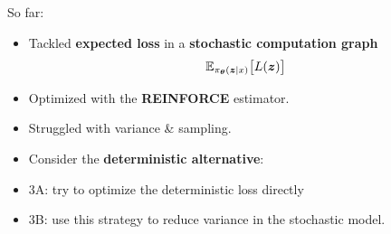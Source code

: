 
\begin{frame}
\centering
So far:
\begin{itemize}
    \item Tackled \textbf{expected loss} in a \textbf{stochastic
        computation graph}
        $$ \mathbb{E}_{\pi_{\boldsymbol{\theta}}(\boldsymbol{z} \mid x)} \big[ L(\boldsymbol{z}) \big] $$
    \item<2-> Optimized with the \textbf{REINFORCE} estimator.
    \item<3-> Struggled with variance \& sampling.
\end{itemize}
\vspace{\baselineskip}
\begin{itemize}
    \item<4-> Consider the \textbf{deterministic alternative}:\\
    \item<7-> 3A: try to optimize the deterministic loss directly
    \item<8-> 3B: use this strategy to reduce variance in the stochastic model.
\end{itemize}
\end{frame}

